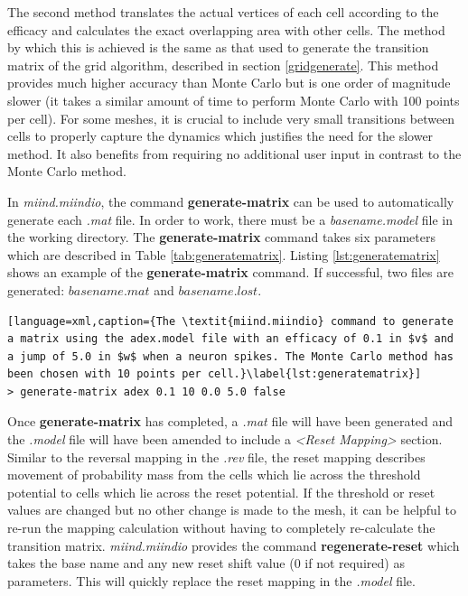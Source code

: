 \documentclass[utf8]{frontiersSCNS} %
\begin{document}
The second method translates the actual vertices of each cell according to the efficacy and calculates the exact overlapping area with other cells. The method by which this is achieved is the same as that used to generate the transition matrix of the grid algorithm, described in section \ref{gridgenerate}. This method provides much higher accuracy than Monte Carlo but is one order of magnitude slower (it takes a similar amount of time to perform Monte Carlo with 100 points per cell). For some meshes, it is crucial to include very small transitions between cells to properly capture the dynamics which justifies the need for the slower method. It also benefits from requiring no additional user input in contrast to the Monte Carlo method.

In \textit{miind.miindio}, the command \textbf{generate-matrix} can be used to automatically generate each \textit{.mat} file. In order to work, there must be a \textit{basename.model} file in the working directory. The \textbf{generate-matrix} command takes six parameters which are described in Table \ref{tab:generatematrix}. Listing \ref{lst:generatematrix} shows an example of the \textbf{generate-matrix} command. If successful, two files are generated: $basename.mat$ and $basename.lost$.

\begin{lstlisting}[language=xml,caption={The \textit{miind.miindio} command to generate a matrix using the adex.model file with an efficacy of 0.1 in $v$ and a jump of 5.0 in $w$ when a neuron spikes. The Monte Carlo method has been chosen with 10 points per cell.}\label{lst:generatematrix}]
> generate-matrix adex 0.1 10 0.0 5.0 false
\end{lstlisting}

Once \textbf{generate-matrix} has completed, a \textit{.mat} file will have been generated and the \textit{.model} file will have been amended to include a \textit{\textless Reset Mapping\textgreater} section. Similar to the reversal mapping in the \textit{.rev} file, the reset mapping describes movement of probability mass from the cells which lie across the threshold potential to cells which lie across the reset potential. If the threshold or reset values are changed but no other change is made to the mesh, it can be helpful to re-run the mapping calculation without having to completely re-calculate the transition matrix. \textit{miind.miindio} provides the command \textbf{regenerate-reset} which takes the base name and any new reset shift value (0 if not required) as parameters. This will quickly replace the reset mapping in the \textit{.model} file.
\end{document}
